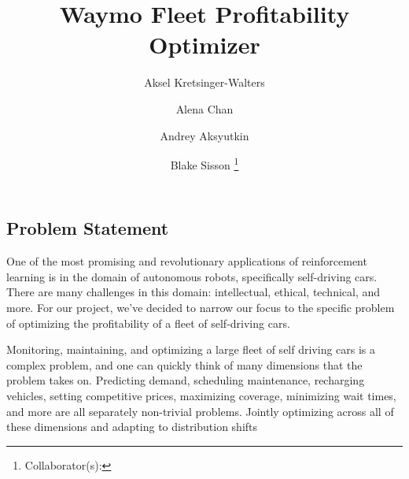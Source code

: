 \documentclass[12pt]{article}
\title{Waymo Fleet Profitability Optimizer}
\author{
		Aksel Kretsinger-Walters \and
		Alena Chan \and
		Andrey Aksyutkin \and
		Blake Sisson \footnote{Collaborator(s): \collaborators}
}
\date{}
\begin{document}
\maketitle

\subsection*{Problem Statement}
One of the most promising and revolutionary applications of reinforcement learning is in
the domain of autonomous robots, specifically self-driving cars. There are many challenges
in this domain: intellectual, ethical, technical, and more. For our project, we've decided
to narrow our focus to the specific problem of optimizing the profitability of a fleet of
self-driving cars.

Monitoring, maintaining, and optimizing a large fleet of self driving cars is a complex
problem, and one can quickly think of many dimensions that the problem takes on.
Predicting demand, scheduling maintenance, recharging vehicles, setting competitive
prices, maximizing coverage, minimizing wait times, and more are all separately non-trivial
problems. Jointly optimizing across all of these dimensions and adapting to distribution shifts
\end{document}
